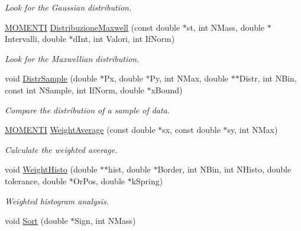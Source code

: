 \begin{DoxyCompactItemize}
\begin{DoxyCompactList}\small\item\em Look for the Gaussian distribution. \end{DoxyCompactList}\item 
\hyperlink{structMOMENTI}{M\+O\+M\+E\+N\+TI} \hyperlink{classMatematica_afbd5fb94779d51392400156cd2210035}{Distribuzione\+Maxwell} (const double $\ast$st, int N\+Mass, double $\ast$Intervalli, double $\ast$d\+Int, int Valori, int If\+Norm)\hypertarget{classMatematica_afbd5fb94779d51392400156cd2210035}{}\label{classMatematica_afbd5fb94779d51392400156cd2210035}

\begin{DoxyCompactList}\small\item\em Look for the Maxwellian distribution. \end{DoxyCompactList}\item 
void \hyperlink{classMatematica_ab160279d67e4266427d7de4983249bd4}{Distr\+Sample} (double $\ast$Px, double $\ast$Py, int N\+Max, double $\ast$$\ast$Distr, int N\+Bin, const int N\+Sample, int If\+Norm, double $\ast$x\+Bound)\hypertarget{classMatematica_ab160279d67e4266427d7de4983249bd4}{}\label{classMatematica_ab160279d67e4266427d7de4983249bd4}

\begin{DoxyCompactList}\small\item\em Compare the distribution of a sample of data. \end{DoxyCompactList}\item 
\hyperlink{structMOMENTI}{M\+O\+M\+E\+N\+TI} \hyperlink{classMatematica_a54768724636e1877a0f515037f9c1dfd}{Weight\+Average} (const double $\ast$sx, const double $\ast$sy, int N\+Max)\hypertarget{classMatematica_a54768724636e1877a0f515037f9c1dfd}{}\label{classMatematica_a54768724636e1877a0f515037f9c1dfd}

\begin{DoxyCompactList}\small\item\em Calculate the weighted average. \end{DoxyCompactList}\item 
void \hyperlink{classMatematica_abfe1241dc3eb4896ae7e45cf740aebde}{Weight\+Histo} (double $\ast$$\ast$hist, double $\ast$Border, int N\+Bin, int N\+Histo, double tolerance, double $\ast$Or\+Pos, double $\ast$k\+Spring)\hypertarget{classMatematica_abfe1241dc3eb4896ae7e45cf740aebde}{}\label{classMatematica_abfe1241dc3eb4896ae7e45cf740aebde}

\begin{DoxyCompactList}\small\item\em Weighted histogram analysis. \end{DoxyCompactList}\item 
void \hyperlink{classMatematica_af650953b36f8898866541e0a18436487}{Sort} (double $\ast$Sign, int N\+Mass)\hypertarget{classMatematica_af650953b36f8898866541e0a18436487}{}\label{classMatematica_af650953b36f8898866541e0a18436487}


\end{DoxyCompactItemize}

